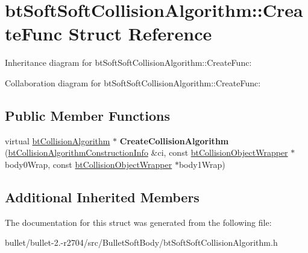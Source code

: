\hypertarget{structbt_soft_soft_collision_algorithm_1_1_create_func}{\section{bt\+Soft\+Soft\+Collision\+Algorithm\+:\+:Create\+Func Struct Reference}
\label{structbt_soft_soft_collision_algorithm_1_1_create_func}
}


Inheritance diagram for bt\+Soft\+Soft\+Collision\+Algorithm\+:\+:Create\+Func\+:


Collaboration diagram for bt\+Soft\+Soft\+Collision\+Algorithm\+:\+:Create\+Func\+:
\subsection*{Public Member Functions}
\begin{DoxyCompactItemize}
\item 
\hypertarget{structbt_soft_soft_collision_algorithm_1_1_create_func_a7f38bc4f48585c2f227f28e1af2702b7}{virtual \hyperlink{classbt_collision_algorithm}{bt\+Collision\+Algorithm} $\ast$ {\bfseries Create\+Collision\+Algorithm} (\hyperlink{structbt_collision_algorithm_construction_info}{bt\+Collision\+Algorithm\+Construction\+Info} \&ci, const \hyperlink{structbt_collision_object_wrapper}{bt\+Collision\+Object\+Wrapper} $\ast$body0\+Wrap, const \hyperlink{structbt_collision_object_wrapper}{bt\+Collision\+Object\+Wrapper} $\ast$body1\+Wrap)}\label{structbt_soft_soft_collision_algorithm_1_1_create_func_a7f38bc4f48585c2f227f28e1af2702b7}

\end{DoxyCompactItemize}
\subsection*{Additional Inherited Members}


The documentation for this struct was generated from the following file\+:\begin{DoxyCompactItemize}
\item 
bullet/bullet-\/2.-\/r2704/src/\+Bullet\+Soft\+Body/bt\+Soft\+Soft\+Collision\+Algorithm.\+h\end{DoxyCompactItemize}
